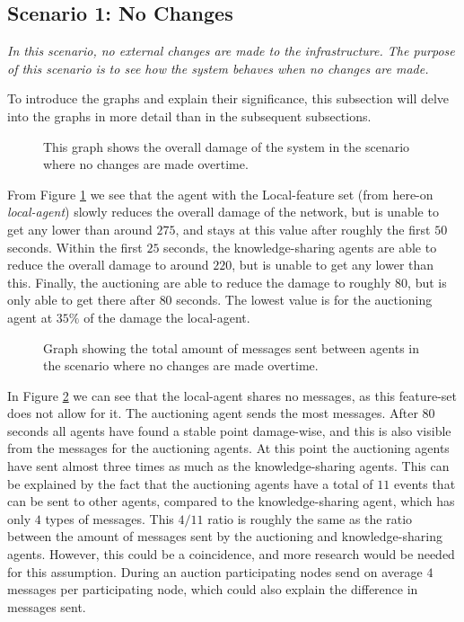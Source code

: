 \subsection{Scenario 1: No Changes}
\textit{In this scenario, no external changes are made to the infrastructure. The purpose of this scenario is to see how the system behaves when no changes are made.}

To introduce the graphs and explain their significance, this subsection will delve into the graphs in more detail than in the subsequent subsections. 

\begin{figure}[H]
    \centering
    
    \caption{This graph shows the overall damage of the system in the scenario where no changes are made overtime.}
    \label{fig:overall-damage-no-change}
\end{figure}

From Figure \ref{fig:overall-damage-no-change} we see that the agent with the Local-feature set (from here-on \textit{local-agent}) slowly reduces the overall damage of the network, but is unable to get any lower than around $275$, and stays at this value after roughly the first $50$ seconds.
Within the first $25$ seconds, the knowledge-sharing agents are able to reduce the overall damage to around $220$, but is unable to get any lower than this. 
Finally, the auctioning are able to reduce the damage to roughly $80$, but is only able to get there after $80$ seconds.
The lowest value is for the auctioning agent at $35\%$ of the damage the local-agent.

\begin{figure}[H]
    \centering
    
    \caption{Graph showing the total amount of messages sent between agents in the scenario where no changes are made overtime.}
    \label{fig:messages-no-change}
\end{figure}

In Figure \ref{fig:messages-no-change} we can see that the local-agent shares no messages, as this feature-set does not allow for it. The auctioning agent sends the most messages. After $80$ seconds all agents have found a stable point damage-wise, and this is also visible from the messages for the auctioning agents. At this point the auctioning agents have sent almost three times as much as the knowledge-sharing agents. This can be explained by the fact that the auctioning agents have a total of $11$ events that can be sent to other agents, compared to the knowledge-sharing agent, which has only $4$ types of messages. This $4 / 11$ ratio is roughly the same as the ratio between the amount of messages sent by the auctioning and knowledge-sharing agents. However, this could be a coincidence, and more research would be needed for this assumption. During an auction participating nodes send on average $4$ messages per participating node, which could also explain the difference in messages sent. 

